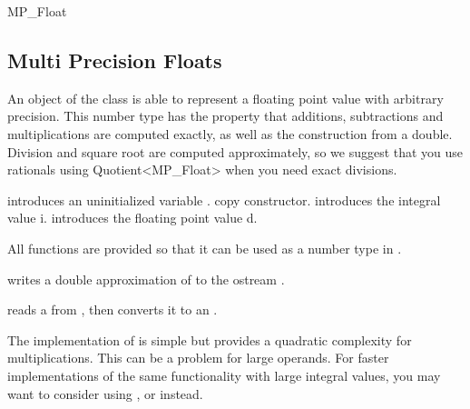 
\begin{ccClass} {MP_Float}
\subsection{Multi Precision Floats}
\label{mpfloat}

\ccDefinition
An object of the class  is able to represent a floating point
value with arbitrary precision.  This number type has the property that
additions, subtractions and multiplications are computed exactly, as well as
the construction from a double.  Division and square root are computed
approximately, so we suggest that you use rationals using Quotient<MP\_Float>
when you need exact divisions.


\ccCreation
{}

{introduces an uninitialized variable \ccVar.}
\ccGlue
{}
{copy constructor.}
\ccGlue
{}
{introduces the integral value i.}
\ccGlue
{}
{introduces the floating point value d.}

\ccOperations
All functions are provided so that it can be used as a number type in
\cgal.

{writes a double approximation of  to the ostream .}

{reads a  from , then converts it to an .}

\ccImplementation 
The implementation of  is simple but provides a quadratic
complexity for multiplications.  This can be a problem for large operands.
For faster implementations of the same functionality with large integral
values, you may want to consider using ,  or 
instead.

\end{ccClass} 
